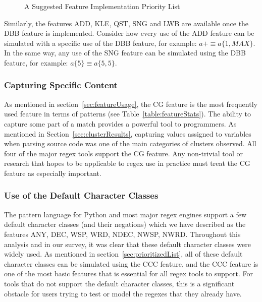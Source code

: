 \begin{figure}[tb]
\caption{A Suggested Feature Implementation Priority List \label{fig:prioritizedList}
}
\end{figure}


Similarly, the features ADD, KLE, QST, SNG and LWB are available once the DBB feature is implemented.  Consider how every use of the ADD feature can be simulated with a specific use of the DBB feature, for example: $a+ \equiv a\{1, MAX\}$.  In the same way, any use of the SNG feature can be simulated using the DBB feature, for example:  $a\{5\} \equiv a\{5, 5\}$.


\subsubsection{Capturing Specific Content}
As mentioned in section~\ref{sec:featureUsage}, the CG feature is the most frequently used feature in terms of patterns (see Table~\ref{table:featureStats}).  The ability to capture some part of a match provides a powerful tool to programmers.  As mentioned in Section~\ref{sec:clusterResults}, capturing values assigned to variables when parsing source code was one of the main categories of clusters observed.  All four of the major regex tools support the CG feature.  Any non-trivial tool or research that hopes to be applicable to regex use in practice must treat the CG feature as especially important.

\subsubsection{Use of the Default Character Classes}
The pattern language for Python and most major regex engines support a few default character classes (and their negations) which we have described as the features ANY, DEC, WSP, WRD, NDEC, NWSP, NWRD.  Throughout this analysis and in our survey,  it was clear that these default character classes were widely used.  As mentioned in section~\ref{sec:prioritizedList}, all of these default character classes can be simulated using the CCC feature, and the CCC feature is one of the most basic features that is essential for all regex tools to support.  For tools that do not support the default character classes, this is a significant obstacle for users trying to test or model the regexes that they already have.

